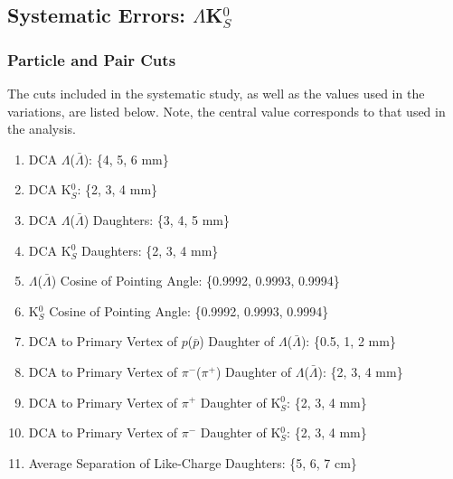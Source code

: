 \documentclass[../AnalysisNoteJBuxton.tex]{subfiles}
\begin{document}
\subsection{Systematic Errors: \texorpdfstring{$\Lambda$K$^{0}_{S}$}{TEXT}}
\label{SysErrsLamK0}

\subsubsection{Particle and Pair Cuts}
\label{SysErrsLamK0:ParticleAndPairCuts}

The cuts included in the systematic study, as well as the values used in the variations, are listed below.  Note, the central value corresponds to that used in the analysis.

\begin{enumerate}
 \item DCA $\Lambda$($\bar{\Lambda}$): \{4, 5, 6 mm\}
 \item DCA K$^{0}_{S}$: \{2, 3, 4 mm\}
 \item DCA $\Lambda$($\bar{\Lambda}$) Daughters: \{3, 4, 5 mm\}
 \item DCA K$^{0}_{S}$ Daughters: \{2, 3, 4 mm\} 
 \item $\Lambda$($\bar{\Lambda}$) Cosine of Pointing Angle: \{0.9992, 0.9993, 0.9994\}
 \item K$^{0}_{S}$ Cosine of Pointing Angle: \{0.9992, 0.9993, 0.9994\}
 \item DCA to Primary Vertex of $p$($\bar{p}$) Daughter of $\Lambda$($\bar{\Lambda}$):  \{0.5, 1, 2 mm\}
 \item DCA to Primary Vertex of $\pi^{-}$($\pi^{+}$) Daughter of $\Lambda$($\bar{\Lambda}$):  \{2, 3, 4 mm\} 
 \item DCA to Primary Vertex of $\pi^{+}$ Daughter of K$^{0}_{S}$: \{2, 3, 4 mm\}
 \item DCA to Primary Vertex of $\pi^{-}$ Daughter of K$^{0}_{S}$: \{2, 3, 4 mm\}
 \item Average Separation of Like-Charge Daughters: \{5, 6, 7 cm\}
\end{enumerate}
\end{document}

